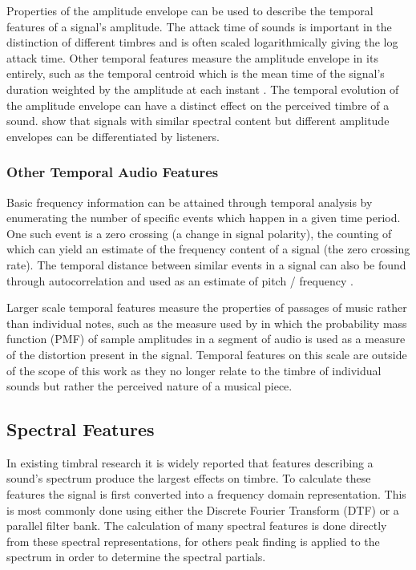			Properties of the amplitude envelope can be used to describe the temporal features of a signal's
			amplitude. The attack time of sounds is important in the distinction of different timbres
			\citep{ilmoniemi2004subjective} and is often scaled logarithmically giving the log attack time.
			Other temporal features measure the amplitude envelope in its entirely, such as the temporal
			centroid which is the mean time of the signal's duration weighted by the amplitude at each instant
			\citep{peeters2000instrument}. The temporal evolution of the amplitude envelope can have a distinct
			effect on the perceived timbre of a sound. \citet{patterson1994the} show that signals with similar
			spectral content but different amplitude envelopes can be differentiated by listeners.

		\subsubsection*{Other Temporal Audio Features}
			Basic frequency information can be attained through temporal analysis by enumerating the number of
			specific events which happen in a given time period. One such event is a zero crossing (a change in
			signal polarity), the counting of which can yield an estimate of the frequency content of a signal
			(the zero crossing rate). The temporal distance between similar events in a signal can also be
			found through autocorrelation and used as an estimate of pitch / frequency \citep{mcleod2005a}.

			Larger scale temporal features measure the properties of passages of music rather than individual
			notes, such as the measure used by \citet{wilson2014profiling} in which the probability mass
			function (PMF) of sample amplitudes in a segment of audio is used as a measure of the distortion
			present in the signal.  Temporal features on this scale are outside of the scope of this work as
			they no longer relate to the timbre of individual sounds but rather the perceived nature of a
			musical piece.

	\subsection{Spectral Features}
	\label{sec:Timbre-LowLevelFeatures-Spectral}
		In existing timbral research it is widely reported that features describing a sound's spectrum produce the
		largest effects on timbre. To calculate these features the signal is first converted into a frequency
		domain representation. This is most commonly done using either the Discrete Fourier Transform (DTF) or a
		parallel filter bank. The calculation of many spectral features is done directly from these spectral
		representations, for others peak finding is applied to the spectrum in order to determine the spectral
		partials.

